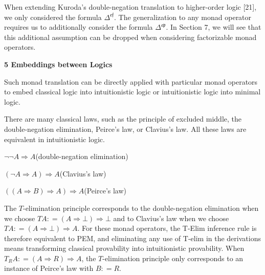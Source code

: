  
When extending Kuroda’s double-negation translation to higher-order logic [21], we only considered the formula $\Delta^{\mathfrak{e}\mathfrak{f}}$. The generalization to any monad operator requires us to additionally consider the formula $\Delta^{\mathfrak{e}\mathfrak{p}}$. In Section 7, we will see that this additional assumption can be dropped when considering factorizable monad operators.\par
 
 
 


 
\par\medskip\noindent\textbf{5 Embeddings between Logics}\par
 
 
Such monad translation can be directly applied with particular monad operators to embed classical logic into intuitionistic logic or intuitionistic logic into minimal logic.\par
 
 
 
There are many classical laws, such as the principle of excluded middle, the double-negation elimination, Peirce’s law, or Clavius’s law. All these laws are equivalent in intuitionistic logic.\par
  
\par  \quad  $\displaystyle\neg\neg A\mathbin{\Rightarrow}A$\quad  \quad  (double-negation elimination)\quad  
 
\par  \quad  $\displaystyle(\neg A\mathbin{\Rightarrow}A)\mathbin{\Rightarrow}A$\quad  \quad  (Clavius’s law)\quad  
 
\par  \quad  $\displaystyle((A\mathbin{\Rightarrow}B)\mathbin{\Rightarrow}A)\mathbin{\Rightarrow}A$\quad  \quad  (Peirce’s law)\quad  
  
The $T$-elimination principle corresponds to the double-negation elimination when we choose $TA\mathrel{\mathop{:}}=(A\mathbin{\Rightarrow}\bot)\mathbin{\Rightarrow}\bot$ and to Clavius’s law when we choose $TA\mathrel{\mathop{:}}=(A\mathbin{\Rightarrow}\bot)\mathbin{\Rightarrow}A$. For these monad operators, the T-Elim inference rule is therefore equivalent to PEM, and eliminating any use of T-elim in the derivations means transforming classical provability into intuitionistic provability. When $T_{R}A\mathrel{\mathop{:}}=(A\mathbin{\Rightarrow}R)\mathbin{\Rightarrow}A$, the $T$-elimination principle only corresponds to an instance of Peirce’s law with $B\mathrel{\mathop{:}}=R$.\par
 
